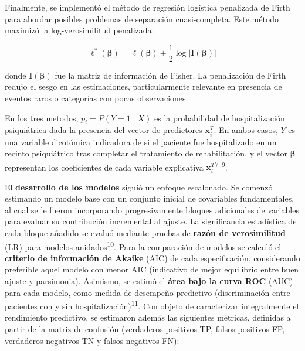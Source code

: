 \documentclass[
  spanish,
  10pt,
]{article}
\begin{document}
Finalmente, se implementó el método de regresión logística penalizada de
Firth para abordar posibles problemas de separación cuasi-completa. Este
método maximizó la log-verosimilitud penalizada:

\[\ell^*(\boldsymbol{\beta}) = \ell(\boldsymbol{\beta}) + \frac{1}{2}\log|\mathbf{I}(\boldsymbol{\beta})|\]

donde \(\mathbf{I}(\boldsymbol{\beta})\) fue la matriz de información de
Fisher. La penalización de Firth redujo el sesgo en las estimaciones,
particularmente relevante en presencia de eventos raros o categorías con
pocas observaciones.

En los tres metodos, \(p_i = P(Y=1 \mid X)\) es la probabilidad de
hospitalización psiquiátrica dada la presencia del vector de predictores
\(\mathbf{x}_i^T\). En ambos casos, \(Y\) es una variable dicotómica
indicadora de si el paciente fue hospitalizado en un recinto
psiquiátrico tras completar el tratamiento de rehabilitación, y el
vector \(\boldsymbol{\beta}\) representan los coeficientes de cada
variable explicativa \(\mathbf{x}_i^T\)\textsuperscript{7--9}.

El \textbf{desarrollo de los modelos} siguió un enfoque escalonado. Se
comenzó estimando un modelo base con un conjunto inicial de covariables
fundamentales, al cual se le fueron incorporando progresivamente bloques
adicionales de variables para evaluar su contribución incremental al
ajuste. La significancia estadística de cada bloque añadido se evaluó
mediante pruebas de \textbf{razón de verosimilitud} (LR) para modelos
anidados\textsuperscript{10}. Para la comparación de modelos se calculó
el \textbf{criterio de información de Akaike} (AIC) de cada
especificación, considerando preferible aquel modelo con menor AIC
(indicativo de mejor equilibrio entre buen ajuste y parsimonia).
Asimismo, se estimó el \textbf{área bajo la curva ROC} (AUC) para cada
modelo, como medida de desempeño predictivo (discriminación entre
pacientes con y sin hospitalización)\textsuperscript{11}. Con objeto de
caracterizar integralmente el rendimiento predictivo, se estimaron
además las siguientes métricas, definidas a partir de la matriz de
confusión (verdaderos positivos TP, falsos positivos FP, verdaderos
negativos TN y falsos negativos FN):
\end{document}
